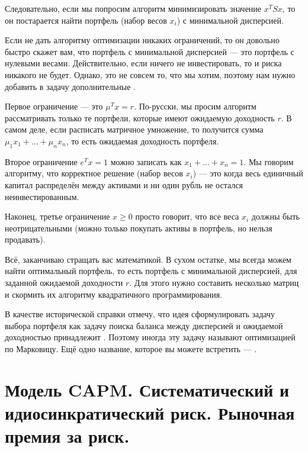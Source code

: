 Следовательно, если мы попросим алгоритм минимизировать значение $x^TSx$, то он 
постарается найти портфель (набор весов $x_i$) с минимальной дисперсией.

Если не дать алгоритму оптимизации никаких ограничений, то он довольно быстро 
скажет вам, что портфель с минимальной дисперсией --- это портфель с нулевыми 
весами. Действительно, если ничего не инвестировать, то и риска никакого не 
будет. Однако, это не совсем то, что мы хотим, поэтому нам нужно добавить в 
задачу дополнительные .

Первое ограничение --- это $\mu^Tx = r$. По-русски, мы просим алгоритм 
рассматривать только те портфели, которые имеют ожидаемую доходность $r$. В 
самом деле, если расписать матричное умножение, то получится сумма $\mu_1x_1 + 
... + \mu_nx_n$, то есть ожидаемая доходность портфеля.

Второе ограничение $e^Tx = 1$ можно записать как $x_1 + ... + x_n = 1$. Мы 
говорим алгоритму, что корректное решение (набор весов $x_i$) --- это когда весь 
единичный капитал распределён между активами и ни один рубль не остался 
неинвестированным.

Наконец, третье ограничение $x \ge 0$ просто говорит, что все веса $x_i$ должны 
быть неотрицательными (можно только покупать активы в портфель, но нельзя 
продавать).

Всё, заканчиваю стращать вас математикой. В сухом остатке, мы всегда можем найти 
оптимальный портфель, то есть портфель с минимальной дисперсией, для заданной 
ожидаемой доходности $r$. Для этого нужно составить несколько матриц и скормить 
их алгоритму квадратичного программирования.

В качестве исторической справки отмечу, что идея сформулировать задачу выбора 
портфеля как задачу поиска баланса между дисперсией и ожидаемой доходностью 
принадлежит  \cite{markowitz1952}. 
Поэтому иногда эту задачу называют оптимизацией по Марковицу. Ещё одно название, 
которое вы можете встретить --- .

\clearpage
\section{Модель CAPM. Систематический и идиосинкратический риск. Рыночная премия
за риск.}

